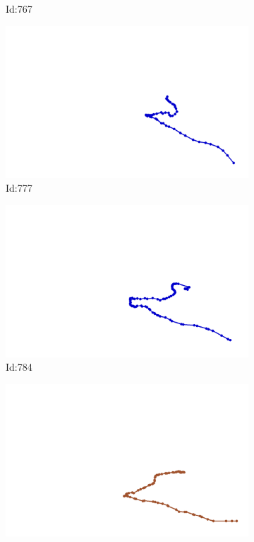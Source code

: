 \documentclass[12pt,twoside]{report}
\begin{document}
\begin{figure}
\begin{subfigure}[b]{0.20\textwidth}
\caption{Id:767}
\end{subfigure}
\begin{subfigure}[b]{0.20\textwidth}
\centering
\includegraphics[width=\textwidth]{../trajectories/777.png}
\caption{Id:777}
\end{subfigure}
\begin{subfigure}[b]{0.20\textwidth}
\centering
\includegraphics[width=\textwidth]{../trajectories/784.png}
\caption{Id:784}
\end{subfigure}
\begin{subfigure}[b]{0.20\textwidth}
\centering
\includegraphics[width=\textwidth]{../trajectories/810.png}

\end{subfigure}
\end{figure}
\end{document}
